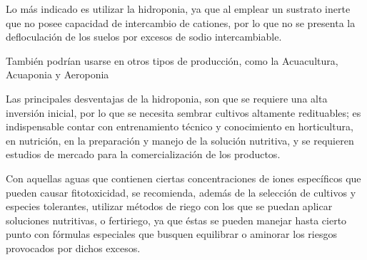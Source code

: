 Lo más indicado es utilizar la hidroponia, ya que al emplear un sustrato inerte que no posee capacidad de intercambio de cationes, por lo que no se presenta la defloculación de los suelos por excesos de sodio intercambiable.

También podrían usarse en otros tipos de producción, como la Acuacultura, Acuaponia y Aeroponia

Las principales desventajas de la hidroponia, son que se requiere una alta inversión inicial, por lo que se necesita sembrar cultivos altamente redituables; es indispensable contar con entrenamiento técnico y conocimiento en horticultura, en nutrición, en la preparación y manejo de la solución nutritiva, y se requieren estudios de mercado para la comercialización de los productos.

Con aquellas aguas que contienen ciertas concentraciones de iones específicos que pueden causar fitotoxicidad, se recomienda, además de la selección de cultivos y especies tolerantes, utilizar métodos de riego con los que se puedan aplicar soluciones nutritivas, o fertiriego, ya que éstas se pueden manejar hasta cierto punto con fórmulas especiales que busquen equilibrar o aminorar los riesgos provocados por dichos excesos.

